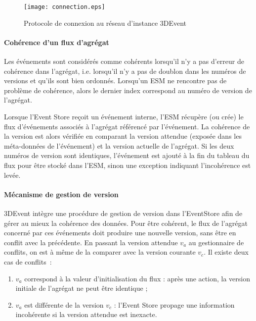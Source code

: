 \begin{figure}[h]
	\noindent
	\centering
	\texttt{[image: connection.eps]}
	\caption{Protocole de connexion au réseau d'instance 3DEvent}
	\label{fig:connexionpairs}
\end{figure}

\paragraph{Cohérence d'un flux d'agrégat}
Les événements sont considérés comme \og cohérents\fg{}  lorsqu'il n'y a pas 
d'erreur de cohérence dans l'agrégat, i.e. lorsqu'il n'y a pas de doublon dans les 
numéros de versions et qu'ils sont bien ordonnés. Lorsqu'un \gls{ESM} ne 
rencontre pas de problème de cohérence, alors le 
dernier index correspond au numéro de version de l'agrégat. 

Lorsque l'Event Store reçoit un événement interne, l'\gls{ESM} récupère (ou crée) 
le flux d'événements associés à l'agrégat référencé par l'événement. 
La cohérence de la version est alors vérifiée en comparant la version attendue 
(exposée dans les méta-données de l'événement) et la version actuelle de 
l'agrégat. 
Si les deux numéros de version sont identiques, l'événement est ajouté à la fin du 
tableau du flux pour être stocké dans l'\gls{ESM}, sinon une exception indiquant 
l'incohérence est levée. 


\paragraph{Mécanisme de gestion de version}
3DEvent intègre une procédure de gestion de version dans l'\gls{EventStore} afin 
de gérer au mieux la cohérence des données. 
Pour être cohérent, le flux de l'agrégat concerné par ces 
événements doit produire une nouvelle version, sans être en conflit avec la 
précédente. En passant la version attendue $v_a$ au gestionnaire de conflits, on 
est à même de la comparer avec la version courante $v_c$. Il existe deux cas de 
conflits~: 
\begin{enumerate}[label=\alph*)]
	\item \label{i:vi} $v_a$ correspond à la valeur d'initialisation du flux : après une 
	action, la version initiale de l'agrégat ne peut être identique ;
	\item \label{i:vdiff} $v_a$ est différente de la version $v_c$ : l'Event Store 
	propage une information incohérente si la version attendue est inexacte.
\end{enumerate}

